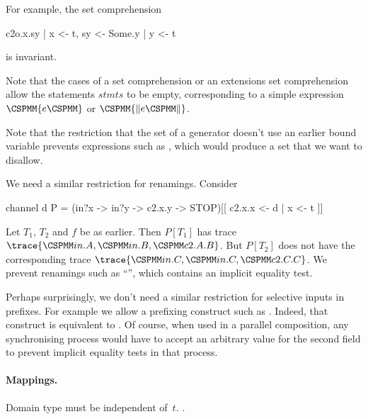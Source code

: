 For example, the set comprehension 
\begin{cspm}
{ c2o.x.sy | x <- t, sy <- {Some.y | y <- t} }
\end{cspm}
is invariant.

Note that the cases of a set comprehension or an extensions set comprehension
allow the statements $stmts$ to be empty, corresponding to a simple expression
$\M\{ e \M\}$ or $\M{\{\|} e \M{\|\}}$.

Note that the restriction that the set of a generator doesn't use an earlier
bound variable prevents expressions such as 
, which would produce a set that we
want to disallow.

We need a similar restriction for renamings.  Consider
%
\begin{cspm}
channel d
P = (in?x -> in?y -> c2.x.y -> STOP)[[ c2.x.x <- d | x <- t ]]
\end{cspm}
%
Let $T_1$, $T_2$ and $f$ be as earlier.  Then $P[T_1]$ has trace $\trace{\M{in}.A,
\M{in}.B, \M{c2}.A.B}$.  But $P[T_2]$ does not have the corresponding trace
$\trace{\M{in}.C, \M{in}.C, \M{c2}.C.C}$.  We prevent renamings such as
``'', which contains an implicit equality test.

Perhaps surprisingly, we don't need a similar restriction for selective inputs
in prefixes.  For example we allow a prefixing construct such
as .  Indeed, that construct is equivalent
to .  Of course, when used in a parallel composition, any
synchronising process would have to accept an arbitrary value for the second
field to prevent implicit equality tests in that process.



\paragraph{Mappings.}  Domain type must be independent
of~$t$.  \framebox{\ldots}. 
